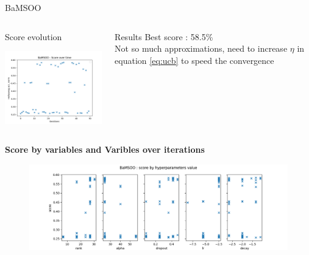 \begin{frame}[allowframebreaks]{BaMSOO}
    
    \begin{columns}
    
        \begin{column}[t]{0.6\textwidth}
            \begin{block}{Score evolution}
                
                \includegraphics[width = 7.5cm]{imgs/plots/exp11_score_over_time.png}
            
            \end{block}   
        \end{column}

        \begin{column}[t]{0.4\textwidth}
            \begin{block}{Results}
                Best score : 58.5\%\\
                Not so much approximations, need to increase $\eta $ in equation \ref{eq:ucb} to speed the convergence              
            \end{block}
            
            
        \end{column}
    \end{columns}    

    \framebreak

    \begin{columns}
    
        \begin{column}{0.65\textwidth}
            \textbf{Score by variables and Varibles over iterations}
                \begin{figure}[h]
                    \includegraphics[width = \textwidth]{imgs/plots/exp11_score_by_hp.png}
                \end{figure}     
        \end{column}


\end{columns}
\end{frame}
